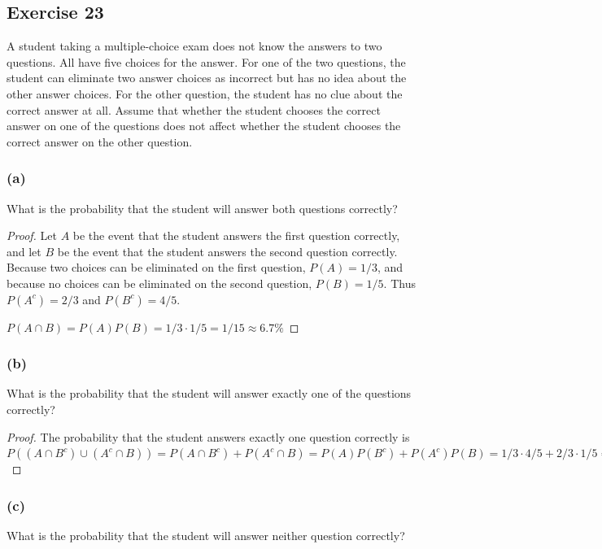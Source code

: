 \documentclass[14pt]{extarticle}
\begin{document}
\subsection{Exercise 23}
A student taking a multiple-choice exam does not know the answers to two questions. All have five choices for the
answer. For one of the two questions, the student can eliminate two answer choices as incorrect but has no idea
about the other answer choices. For the other question, the student has no clue about the correct answer at all. Assume
that whether the student chooses the correct answer on one of the questions does not affect whether the student chooses the
correct answer on the other question.

\subsubsection{(a)}
What is the probability that the student will answer both questions correctly?

\begin{proof}
     Let \(A\) be the event that the student answers the first question correctly, and let \(B\) be the event that the
     student answers the second question correctly. Because two choices can be eliminated on the first question,
     \(P(A) = 1/3\), and because no choices can be eliminated on the second question, \(P(B) = 1/5\). Thus \(P(A^c) = 2/3\) and
     \(P(B^c) = 4/5\).

     \(P(A \cap B) = P(A)P(B) = 1/3 \cdot 1/5 = 1/15 \approx 6.7\%\)
\end{proof}

\subsubsection{(b)}
What is the probability that the student will answer exactly one of the questions correctly?

\begin{proof}
     The probability that the student answers exactly one question correctly is \(P((A \cap B^c) \cup (A^c \cap B)) = P(A \cap
     B^c) + P(A^c \cap B) = P(A)P(B^c) + P(A^c)P(B) = 1/3 \cdot 4/5 + 2/3 \cdot 1/5 = 6/15 = 2/5 = 40\%\)
\end{proof}

\subsubsection{(c)}
What is the probability that the student will answer neither question correctly?
\end{document}
